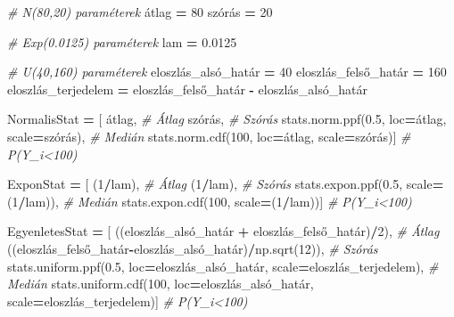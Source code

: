 \documentclass[
]{book}
\newenvironment{Shaded}{\begin{snugshade}}{\end{snugshade}}
\newcommand{\CommentTok}[1]{\textcolor[rgb]{0.56,0.35,0.01}{\textit{#1}}}
\newcommand{\DecValTok}[1]{\textcolor[rgb]{0.00,0.00,0.81}{#1}}
\newcommand{\FloatTok}[1]{\textcolor[rgb]{0.00,0.00,0.81}{#1}}
\newcommand{\NormalTok}[1]{#1}
\newcommand{\OperatorTok}[1]{\textcolor[rgb]{0.81,0.36,0.00}{\textbf{#1}}}
\begin{document}
\begin{Shaded}
\begin{Highlighting}[]
\CommentTok{\# N(80,20) paraméterek}
\NormalTok{átlag }\OperatorTok{=} \DecValTok{80}
\NormalTok{szórás }\OperatorTok{=} \DecValTok{20}

\CommentTok{\# Exp(0.0125) paraméterek}
\NormalTok{lam }\OperatorTok{=} \FloatTok{0.0125}

\CommentTok{\# U(40,160) paraméterek}
\NormalTok{eloszlás\_alsó\_határ }\OperatorTok{=} \DecValTok{40}
\NormalTok{eloszlás\_felső\_határ }\OperatorTok{=} \DecValTok{160}
\NormalTok{eloszlás\_terjedelem }\OperatorTok{=}\NormalTok{ eloszlás\_felső\_határ }\OperatorTok{{-}}\NormalTok{ eloszlás\_alsó\_határ}

\NormalTok{NormalisStat }\OperatorTok{=}\NormalTok{ [}
\NormalTok{  átlag, }\CommentTok{\# Átlag}
\NormalTok{  szórás, }\CommentTok{\# Szórás}
\NormalTok{  stats.norm.ppf(}\FloatTok{0.5}\NormalTok{, loc}\OperatorTok{=}\NormalTok{átlag, scale}\OperatorTok{=}\NormalTok{szórás), }\CommentTok{\# Medián}
\NormalTok{  stats.norm.cdf(}\DecValTok{100}\NormalTok{, loc}\OperatorTok{=}\NormalTok{átlag, scale}\OperatorTok{=}\NormalTok{szórás)] }\CommentTok{\# P(Y\_i\textless{}100)}

\NormalTok{ExponStat }\OperatorTok{=}\NormalTok{ [}
\NormalTok{  (}\DecValTok{1}\OperatorTok{/}\NormalTok{lam), }\CommentTok{\# Átlag}
\NormalTok{  (}\DecValTok{1}\OperatorTok{/}\NormalTok{lam), }\CommentTok{\# Szórás}
\NormalTok{  stats.expon.ppf(}\FloatTok{0.5}\NormalTok{, scale}\OperatorTok{=}\NormalTok{(}\DecValTok{1}\OperatorTok{/}\NormalTok{lam)), }\CommentTok{\# Medián}
\NormalTok{  stats.expon.cdf(}\DecValTok{100}\NormalTok{, scale}\OperatorTok{=}\NormalTok{(}\DecValTok{1}\OperatorTok{/}\NormalTok{lam))] }\CommentTok{\# P(Y\_i\textless{}100)}

\NormalTok{EgyenletesStat }\OperatorTok{=}\NormalTok{ [}
\NormalTok{  ((eloszlás\_alsó\_határ }\OperatorTok{+}\NormalTok{ eloszlás\_felső\_határ)}\OperatorTok{/}\DecValTok{2}\NormalTok{), }\CommentTok{\# Átlag}
\NormalTok{  ((eloszlás\_felső\_határ}\OperatorTok{{-}}\NormalTok{eloszlás\_alsó\_határ)}\OperatorTok{/}\NormalTok{np.sqrt(}\DecValTok{12}\NormalTok{)), }\CommentTok{\# Szórás}
\NormalTok{  stats.uniform.ppf(}\FloatTok{0.5}\NormalTok{, loc}\OperatorTok{=}\NormalTok{eloszlás\_alsó\_határ, scale}\OperatorTok{=}\NormalTok{eloszlás\_terjedelem), }\CommentTok{\# Medián}
\NormalTok{  stats.uniform.cdf(}\DecValTok{100}\NormalTok{, loc}\OperatorTok{=}\NormalTok{eloszlás\_alsó\_határ, scale}\OperatorTok{=}\NormalTok{eloszlás\_terjedelem)] }\CommentTok{\# P(Y\_i\textless{}100)}


\end{Highlighting}
\end{Shaded}
\end{document}
